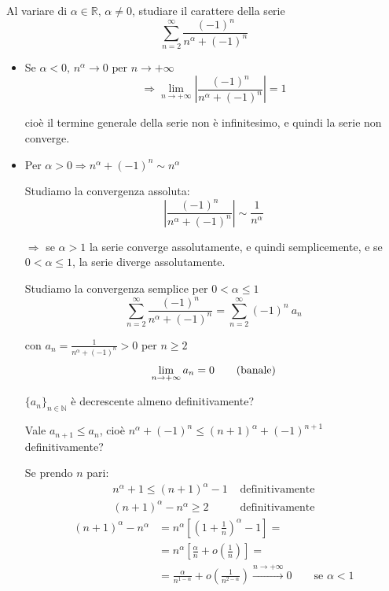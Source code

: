 \begin{exbar}
\begin{example}
	Al variare di $\alpha \in \mathbb{R}, \, \alpha \neq 0$, studiare il carattere della serie
	\begin{equation*}
		\sum_{n=2}^{\infty} \frac{(-1)^n} {n^\alpha + (-1)^n}
	\end{equation*}
	
	\begin{itemize}
	\item Se $\alpha < 0, \, n^\alpha \rightarrow 0 \text{ per } n \rightarrow +\infty$ 
	\begin{equation*}
		\Rightarrow \lim_{n \rightarrow +\infty} \left| \frac{(-1)^n} {n^\alpha + (-1)^n} \right| = 1
	\end{equation*}
	
	cioè il termine generale della serie non è infinitesimo, e quindi la serie non converge.
	
	\item Per $\alpha > 0 \Rightarrow n^\alpha + (-1)^n \sim n^\alpha$ 
	
	Studiamo la convergenza assoluta:
	\begin{equation*}
		\left| \frac{(-1)^n} {n^\alpha + (-1)^n} \right| \sim \frac{1} {n^\alpha}
	\end{equation*}
	
	$\Rightarrow$ se $\alpha>1$ la serie converge assolutamente, e quindi semplicemente, e se $ 0 < \alpha \leq 1 $, la serie diverge assolutamente.
	
	Studiamo la convergenza semplice per $0 < \alpha \leq 1$
	\begin{equation*}
		\sum_{n=2}^{\infty} \frac{(-1)^n} {n^\alpha + (-1)^n} = \sum_{n=2}^{\infty} (-1)^n \ a_n
	\end{equation*}
	
	con $a_n=\frac{1}{n^\alpha + (-1)^n} > 0$ per $n \geq 2$
	\begin{equation*}
		\lim_{n \rightarrow +\infty} a_n = 0 \qquad \text{(banale)}
	\end{equation*}
	
	$\{a_n\}_{n \in \mathbb{N}}$ è decrescente almeno definitivamente?
	
	Vale $a_{n+1} \leq a_{n}$, cioè $n^\alpha + (-1)^n \leq (n+1)^\alpha + (-1)^{n+1}$ definitivamente?
	
	Se prendo $n$ pari:
	\begin{align*}
		n^\alpha + 1 \leq (n+1)^\alpha - 1 & \text{ definitivamente}
		\\
		(n+1)^\alpha - n^\alpha \geq 2 & \text{ definitivamente}
	\end{align*}
	\begin{align*}
		(n+1)^\alpha - n^\alpha 
		&= n^\alpha \left[ \left( 1 + \frac{1} {n} \right)^\alpha - 1 \right] =
		\\
		&= n^\alpha \left[ \frac{\alpha} {n} + o \left( \frac{1} {n} \right) \right] =
		\\
		&= \frac{\alpha} {n^{1 - \alpha}} + o \left( \frac{1} {n^{2 - \alpha}} \right) \xrightarrow{n \rightarrow +\infty} 0 \qquad \text{se } \alpha <1
	\end{align*}
	

\end{itemize}
\end{example}
\end{exbar}
